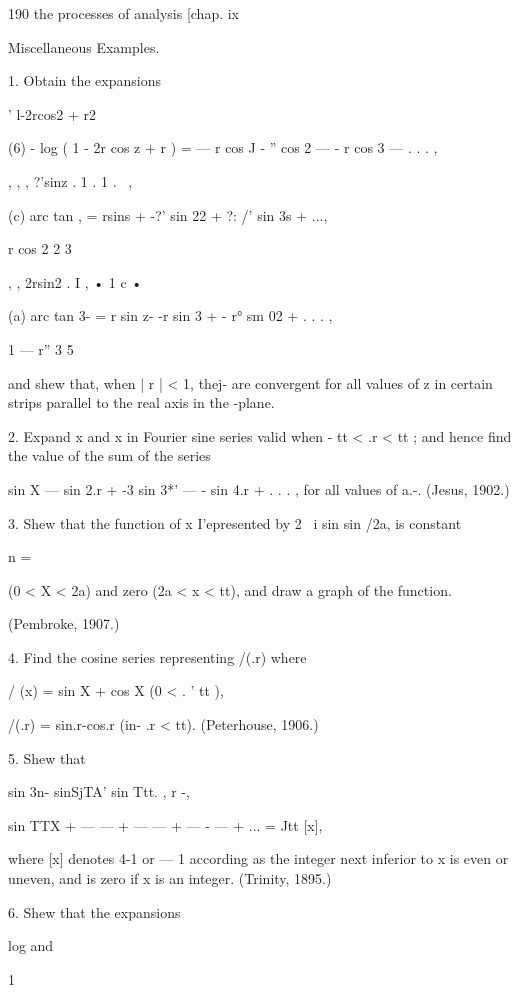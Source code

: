{190 the processes of analysis [chap. ix 

Miscellaneous Examples. 

1. Obtain the expansions 

  ' l-2rcos2 + r2 

(6) - log ( 1 - 2r cos z + r ) = — r cos J -   ''  cos 2  — - r  cos 3  — . . . , 

, , , ?'sinz . 1   .   1   . \  , 

(c) arc tan , = rsins + -?' sin 22 + ?: /'  sin 3s + ..., 

   r cos 2 2 3 

,   , 2rsin2 . I , •   1 c •   

(a) arc tan 3- = r sin z- -r  sin 3  + - r° sm 02 + . . . , 

1 — r'' 3 5 

and shew that, when | r | < 1, thej- are convergent for all values of z in certain strips 
parallel to the real axis in the  -plane. 

2. Expand x  and x in Fourier sine series valid when - tt < .r < tt ; and hence find 
the value of the sum of the series 

sin X —   sin 2.r + -3 sin 3*' — -  sin 4.r + . . . , 
for all values of a.-. (Jesus, 1902.) 

3. Shew that the function of x I'epresented by 2  ~i sin    sin  /2a, is constant 

n = \ 

(0 < X < 2a) and zero (2a < x < tt), and draw a graph of the function. 

(Pembroke, 1907.) 

4. Find the cosine series representing /(.r) where 

/ (x) = sin X + cos X (0 < . '  tt ), 

/(.r) = sin.r-cos.r (in-   .r < tt). (Peterhouse, 1906.) 

5. Shew that 

sin 3n-  sinSjTA' sin Ttt.  , r -, 

sin TTX + —   — + —   — + — - — + ... = Jtt [x], 

where [x] denotes 4-1 or — 1 according as the integer next inferior to x is even or uneven, 
and is zero if x is an integer. (Trinity, 1895.) 

6. Shew that the expansions 



log 
and 



1 

}
